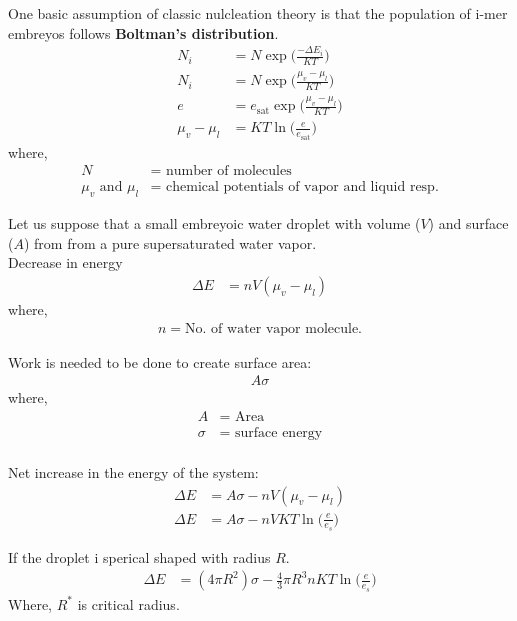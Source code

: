 \documentclass[fleqn,10pt]{SelfArx} %
\begin{document}
One basic assumption of classic nulcleation theory is that the population of i-mer embreyos follows \textbf{Boltman's distribution}.
\begin{align}
    N_i &= N \exp{\Big(\frac{-\Delta E_i}{KT}\Big)} \\
    N_i &= N \exp{\Big(\frac{\mu_v-\mu_l}{KT}\Big)} \\
    e &= e_{\text{sat}} \exp{\Big(\frac{\mu_v-\mu_l}{KT}\Big)} \\
    \mu_v-\mu_l &= KT \ln{\Big(\frac{e}{e_{\text{sat}}}\Big)}
\end{align}
where,
\begin{align*}
    N &= \text{ number of molecules} \\
    \mu_v \text{ and } \mu_l &= \text{ chemical potentials of vapor and liquid resp.}
\end{align*}

Let us suppose that a small embreyoic water droplet with volume ($V$) and surface ($A$) from from a pure supersaturated water vapor. \\
Decrease in energy
\begin{align}
    \Delta E &= nV (\mu_v - \mu_l)
\end{align}
where,
\begin{align*}
    n = \text{No. of water vapor molecule.}
\end{align*}

Work is needed to be done to create surface area:
\begin{align}
    A \sigma
\end{align}
where,
\begin{align*}
    A &= \text{ Area} \\
    \sigma &= \text{ surface energy} \\
\end{align*}

Net increase in the energy of the system: 
\begin{align}
    \Delta E &= A\sigma - nV(\mu_v -\mu_l) \\
    \Delta E &= A\sigma - nVKT \ln{\Big(\frac{e}{e_s}\Big)}
\end{align}

If the droplet i sperical shaped with radius $R$.
\begin{align}
    \Delta E &= (4\pi R^2)\sigma - \frac{4}{3}\pi R^3nKT \ln{\Big(\frac{e}{e_s}\Big)}
\end{align}
Where, $R^*$ is critical radius.
\end{document}
